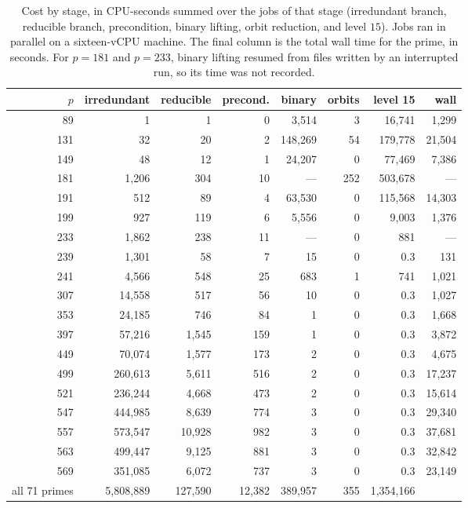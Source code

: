\begin{table}[ht]\centering\caption{Cost by stage, in CPU-seconds summed over the jobs of that stage (irredundant branch, reducible branch, precondition, binary lifting, orbit reduction, and level $15$).  Jobs ran in parallel on a sixteen-vCPU machine.  The final column is the total wall time for the prime, in seconds.  For $p=181$ and $p=233$, binary lifting resumed from files written by an interrupted run, so its time was not recorded.}\label{tab:cost}\small
\begin{tabular}{@{}rrrrrrrr@{}}\toprule $p$ & irredundant & reducible & precond. & binary & orbits & level 15 & wall\\ \midrule
89 & 1 & 1 & 0 & 3,514 & 3 & 16,741 & 1,299\\
131 & 32 & 20 & 2 & 148,269 & 54 & 179,778 & 21,504\\
149 & 48 & 12 & 1 & 24,207 & 0 & 77,469 & 7,386\\
181 & 1,206 & 304 & 10 & --- & 252 & 503,678 & ---\\
191 & 512 & 89 & 4 & 63,530 & 0 & 115,568 & 14,303\\
199 & 927 & 119 & 6 & 5,556 & 0 & 9,003 & 1,376\\
233 & 1,862 & 238 & 11 & --- & 0 & 881 & ---\\
239 & 1,301 & 58 & 7 & 15 & 0 & 0.3 & 131\\
241 & 4,566 & 548 & 25 & 683 & 1 & 741 & 1,021\\
307 & 14,558 & 517 & 56 & 10 & 0 & 0.3 & 1,027\\
353 & 24,185 & 746 & 84 & 1 & 0 & 0.3 & 1,668\\
397 & 57,216 & 1,545 & 159 & 1 & 0 & 0.3 & 3,872\\
449 & 70,074 & 1,577 & 173 & 2 & 0 & 0.3 & 4,675\\
499 & 260,613 & 5,611 & 516 & 2 & 0 & 0.3 & 17,237\\
521 & 236,244 & 4,668 & 473 & 2 & 0 & 0.3 & 15,614\\
547 & 444,985 & 8,639 & 774 & 3 & 0 & 0.3 & 29,340\\
557 & 573,547 & 10,928 & 982 & 3 & 0 & 0.3 & 37,681\\
563 & 499,447 & 9,125 & 881 & 3 & 0 & 0.3 & 32,842\\
569 & 351,085 & 6,072 & 737 & 3 & 0 & 0.3 & 23,149\\
\midrule all 71 primes & 5,808,889 & 127,590 & 12,382 & 389,957 & 355 & 1,354,166 & \\
\bottomrule\end{tabular}\end{table}
